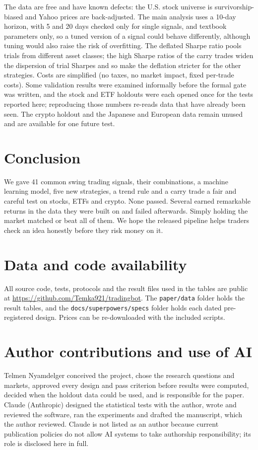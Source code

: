 \documentclass[11pt]{article}
\begin{document}
The data are free and have known defects: the U.S. stock universe is survivorship-biased and Yahoo
prices are back-adjusted. The main analysis uses a 10-day horizon, with 5 and 20 days checked only
for single signals, and textbook parameters only, so a tuned version of a signal could behave
differently, although tuning would also raise the risk of overfitting. The deflated Sharpe ratio
pools trials from different asset classes; the high Sharpe ratios of the carry trades widen the
dispersion of trial Sharpes and so make the deflation stricter for the other strategies. Costs are simplified (no taxes, no market impact, fixed per-trade costs). Some
validation results were examined informally before the formal gate was written, and the stock and
ETF holdouts were each opened once for the tests reported here; reproducing those numbers re-reads
data that have already been seen. The crypto holdout and the Japanese and European data remain
unused and are available for one future test.

\section{Conclusion}

We gave 41 common swing trading signals, their combinations, a machine learning model, five new
strategies, a trend rule and a carry trade a fair and careful test on stocks, ETFs and crypto. None
passed. Several earned remarkable returns in the data they were built on and failed afterwards.
Simply holding the market matched or beat all of them. We hope the released pipeline helps traders
check an idea honestly before they risk money on it.

\section*{Data and code availability}
All source code, tests, protocols and the result files used in the tables are public at
\url{https://github.com/Temka921/tradingbot}. The \texttt{paper/data} folder holds the result
tables, and the \texttt{docs/superpowers/specs} folder holds each dated pre-registered design.
Prices can be re-downloaded with the included scripts.

\section*{Author contributions and use of AI}
Telmen Nyamdelger conceived the project, chose the research questions and markets, approved every
design and pass criterion before results were computed, decided when the holdout data could be used,
and is responsible for the paper. Claude (Anthropic) designed the statistical tests with the author,
wrote and reviewed the software, ran the experiments and drafted the manuscript, which the author
reviewed. Claude is not listed as an author because current publication policies do not allow AI
systems to take authorship responsibility; its role is disclosed here in full.
\end{document}

